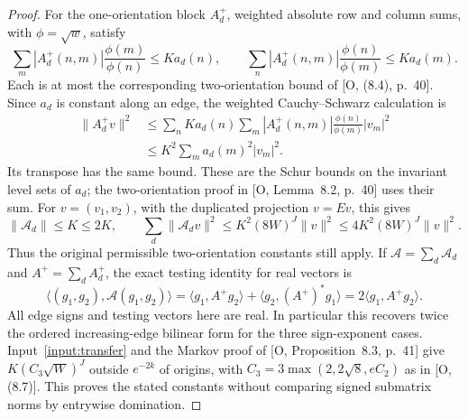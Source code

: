 \documentclass[11pt]{article}
\theoremstyle{definition}
\theoremstyle{remark}
\numberwithin{equation}{section}
\begin{document}
\begin{proof}
For the one-orientation block $A_d^+$, weighted absolute row and column sums, with $\phi=\sqrt w$, satisfy
\begin{equation}\label{eq:phase-one-orientation-schur}
 \sum_m|A_d^+(n,m)|\frac{\phi(m)}{\phi(n)}\le Ka_d(n),\qquad
 \sum_n|A_d^+(n,m)|\frac{\phi(n)}{\phi(m)}\le Ka_d(m).
\end{equation}
Each is at most the corresponding two-orientation bound of [O, (8.4), p.~40].
Since $a_d$ is constant along an edge, the weighted Cauchy--Schwarz calculation is
\begin{equation}\label{eq:phase-schur-calculation}
\begin{aligned}
 \|A_d^+v\|^2
 &\le\sum_n Ka_d(n)\sum_m|A_d^+(n,m)|\frac{\phi(n)}{\phi(m)}|v_m|^2\\
 &\le K^2\sum_m a_d(m)^2|v_m|^2.
\end{aligned}
\end{equation}
Its transpose has the same bound. These are the Schur bounds on the invariant level sets of $a_d$;
the two-orientation proof in [O, Lemma~8.2, p.~40] uses their sum.
For $v=(v_1,v_2)$, with the duplicated projection $v=Ev$, this gives
\begin{equation}\label{eq:phase-schur}
 \|\mathcal A_d\|\le K\le2K,\qquad
 \sum_d\|\mathcal A_dv\|^2\le K^2(8W)^J\|v\|^2\le4K^2(8W)^J\|v\|^2.
\end{equation}
Thus the original permissible two-orientation constants still apply.
If $\mathcal A=\sum_d\mathcal A_d$ and $A^+=\sum_d A_d^+$, the exact testing identity for real vectors is
\begin{equation}\label{eq:phase-quadratic-form}
 \langle(g_1,g_2),\mathcal A(g_1,g_2)\rangle
 =\langle g_1,A^+g_2\rangle+\langle g_2,(A^+)^*g_1\rangle
 =2\langle g_1,A^+g_2\rangle.
\end{equation}
All edge signs and testing vectors here are real. In particular this recovers twice the ordered increasing-edge
bilinear form for the three sign-exponent cases.
Input~\ref{input:transfer} and the Markov proof of [O, Proposition~8.3, p.~41] give
$K(C_3\sqrt W)^J$ outside $e^{-2k}$ of origins, with
$C_3=3\max(2,2\sqrt8,eC_2)$ as in [O, (8.7)]. This proves the stated constants without comparing signed
submatrix norms by entrywise domination.
\end{proof}
\end{document}
